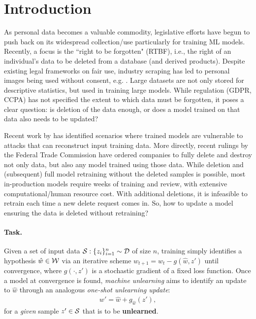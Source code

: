\section{Introduction}
As personal data becomes a valuable commodity, legislative efforts have begun to push back on its widespread collection/use particularly for training ML models. Recently, a focus is the ``right to be forgotten" (RTBF), i.e., the right of an individual's data to be deleted from a database (and derived products).
Despite existing legal frameworks on fair use, industry scraping has led to personal images being used without consent, e.g. \cite{Exposing}.
Large datasets are not only stored for descriptive statistics, but used in training large models.
While regulation (GDPR, CCPA) has not specified the extent to which data must be forgotten, it poses a clear question: is  deletion of the data enough, or does a model trained on that data also needs to be updated?

Recent work by \cite{carlini2019secret,carlini2020attack} has identified scenarios where trained models are vulnerable to attacks that can reconstruct input training data. More directly, recent rulings by the Federal Trade Commission \cite{ftc,ftc2} have ordered companies to fully delete and destroy not only data, but also any model trained using those data.
While deletion and (subsequent) full model retraining without the deleted samples is possible, most in-production models require weeks of 
training and review, with extensive computational/human resource cost. With additional deletions, it is infeasible to retrain each time a new delete request comes in. 
So, how to update a model ensuring the data is deleted without retraining?

\paragraph{Task.} Given a set of input data $\mathcal{S}: \{z_i\}_{i=1}^n \sim \mathcal{D}$ of size $n$, training simply identifies a hypothesis $\hat{w} \in \mathcal{W}$  via an iterative scheme $w_{t+1} = w_t - g(\hat{w},z')$ until convergence, where $g(\cdot,z')$ is  a stochastic gradient of a fixed loss function. Once a model at convergence is found, \textit{machine unlearning} aims to identify an update to $\hat{w}$ through an analogous {\em one-shot unlearning update}:
\begin{align}\label{eq:unlearn}
    w' = \hat{w} + g_{\hat{w}}\left(z'\right),
\end{align}
for a \textit{given} sample $z' \in \mathcal{S}$ that is to be \textbf{unlearned}.

